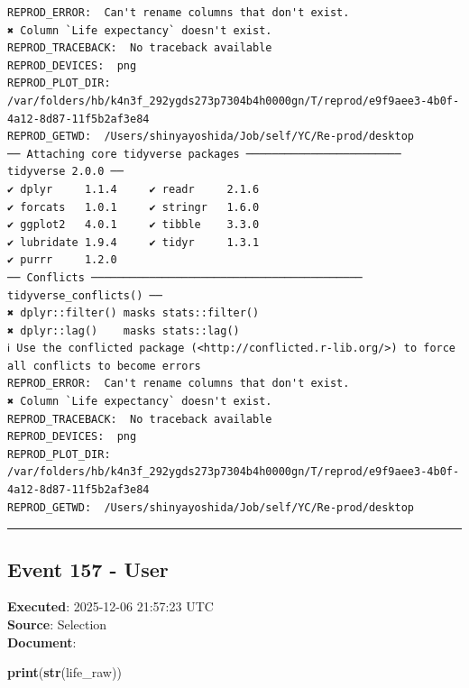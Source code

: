 \documentclass[
  11pt,
]{article}
\newenvironment{Shaded}{\begin{snugshade}}{\end{snugshade}}
\newcommand{\FunctionTok}[1]{\textcolor[rgb]{0.13,0.29,0.53}{\textbf{#1}}}
\newcommand{\NormalTok}[1]{#1}
\newenvironment{rpoutput}{\vspace{0.5em}\begin{snugshade}}{\end{snugshade}}
\begin{document}
\begin{rpoutput}

\begin{verbatim}
REPROD_ERROR:  Can't rename columns that don't exist.
✖ Column `Life expectancy` doesn't exist. 
REPROD_TRACEBACK:  No traceback available  
REPROD_DEVICES:  png 
REPROD_PLOT_DIR:  /var/folders/hb/k4n3f_292ygds273p7304b4h0000gn/T/reprod/e9f9aee3-4b0f-4a12-8d87-11f5b2af3e84 
REPROD_GETWD:  /Users/shinyayoshida/Job/self/YC/Re-prod/desktop 
── Attaching core tidyverse packages ──────────────────────── tidyverse 2.0.0 ──
✔ dplyr     1.1.4     ✔ readr     2.1.6
✔ forcats   1.0.1     ✔ stringr   1.6.0
✔ ggplot2   4.0.1     ✔ tibble    3.3.0
✔ lubridate 1.9.4     ✔ tidyr     1.3.1
✔ purrr     1.2.0     
── Conflicts ────────────────────────────────────────── tidyverse_conflicts() ──
✖ dplyr::filter() masks stats::filter()
✖ dplyr::lag()    masks stats::lag()
ℹ Use the conflicted package (<http://conflicted.r-lib.org/>) to force all conflicts to become errors
REPROD_ERROR:  Can't rename columns that don't exist.
✖ Column `Life expectancy` doesn't exist. 
REPROD_TRACEBACK:  No traceback available  
REPROD_DEVICES:  png 
REPROD_PLOT_DIR:  /var/folders/hb/k4n3f_292ygds273p7304b4h0000gn/T/reprod/e9f9aee3-4b0f-4a12-8d87-11f5b2af3e84 
REPROD_GETWD:  /Users/shinyayoshida/Job/self/YC/Re-prod/desktop 
\end{verbatim}

\end{rpoutput}

\begin{center}\rule{0.5\linewidth}{0.5pt}\end{center}

\subsection{Event 157 - User}\label{event-157---user}

\textbf{Executed}: 2025-12-06 21:57:23 UTC\\
\textbf{Source}: Selection\\
\textbf{Document}:

\begin{Shaded}
\begin{Highlighting}[]
\FunctionTok{print}\NormalTok{(}\FunctionTok{str}\NormalTok{(life\_raw))}
\end{Highlighting}
\end{Shaded}
\end{document}
